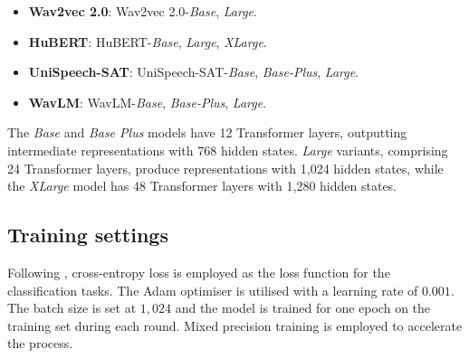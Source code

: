 \documentclass[cameraready]{Interspeech}
\begin{document}
\begin{itemize}
    \item \textbf{Wav2vec 2.0}: Wav2vec 2.0-\textit{Base}, \textit{Large}.
    \item \textbf{HuBERT}: HuBERT-\textit{Base}, \textit{Large}, \textit{XLarge}.
    \item \textbf{UniSpeech-SAT}: UniSpeech-SAT-\textit{Base}, \textit{Base-Plus}, \textit{Large}.
    \item \textbf{WavLM}: WavLM-\textit{Base}, \textit{Base-Plus}, \textit{Large}.
\end{itemize}

The \textit{Base} and \textit{Base Plus} models have 12 Transformer layers, outputting intermediate representations with 768 hidden states. \textit{Large} variants, comprising 24 Transformer layers, produce representations with 1,024 hidden states, while the \textit{XLarge} model has 48 Transformer layers with 1,280 hidden states.


\subsection{Training settings}

Following \cite{raj19asru}, cross-entropy loss is employed as the loss function for the classification tasks. The Adam optimiser is utilised with a learning rate of $0.001$. The batch size is set at $1,024$ and the model is trained for one epoch on the training set during each round. Mixed precision training is employed to accelerate the process.
\end{document}

